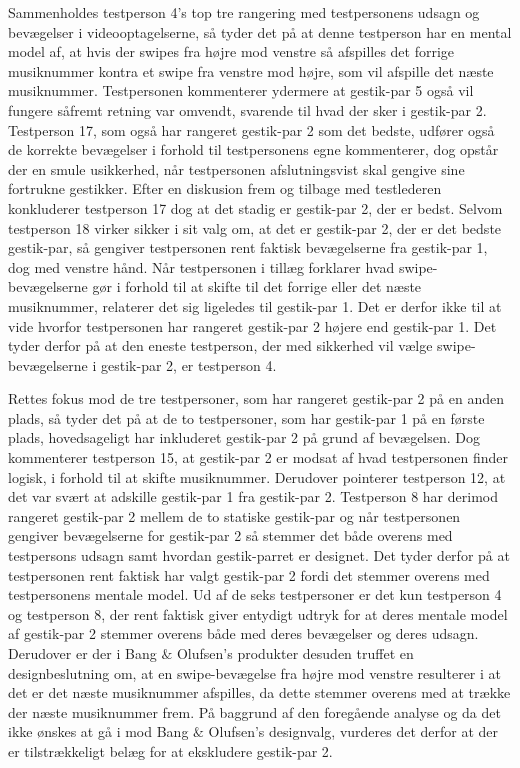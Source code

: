 Sammenholdes testperson 4's top tre rangering med testpersonens udsagn og bevægelser i videooptagelserne, så tyder det på at denne testperson har en mental model af, at hvis der swipes fra højre mod venstre så afspilles det forrige musiknummer kontra et swipe fra venstre mod højre, som vil afspille det næste musiknummer. Testpersonen kommenterer ydermere at gestik-par 5 også vil fungere såfremt retning var omvendt, svarende til hvad der sker i gestik-par 2. Testperson 17, som også har rangeret gestik-par 2 som det bedste, udfører også de korrekte bevægelser i forhold til testpersonens egne kommenterer, dog opstår der en smule usikkerhed, når testpersonen afslutningsvist skal gengive sine fortrukne gestikker. Efter en diskusion frem og tilbage med testlederen konkluderer testperson 17 dog at det stadig er gestik-par 2, der er bedst. Selvom testperson 18 virker sikker i sit valg om, at det er gestik-par 2, der er det bedste gestik-par, så gengiver testpersonen rent faktisk bevægelserne fra gestik-par 1, dog med venstre hånd. Når testpersonen i tillæg forklarer hvad swipe-bevægelserne gør i forhold til at skifte til det forrige eller det næste musiknummer, relaterer det sig ligeledes til gestik-par 1. Det er derfor ikke til at vide hvorfor testpersonen har rangeret gestik-par 2 højere end gestik-par 1. Det tyder derfor på at den eneste testperson, der med sikkerhed vil vælge swipe-bevægelserne i gestik-par 2, er testperson 4. 

Rettes fokus mod de tre testpersoner, som har rangeret gestik-par 2 på en anden plads, så tyder det på at de to testpersoner, som har gestik-par 1 på en første plads, hovedsageligt har inkluderet gestik-par 2 på grund af bevægelsen. Dog kommenterer testperson 15, at gestik-par 2 er modsat af hvad testpersonen finder logisk, i forhold til at skifte musiknummer.  Derudover pointerer testperson 12, at det var svært at adskille gestik-par 1 fra gestik-par 2. Testperson 8 har derimod rangeret gestik-par 2 mellem de to statiske gestik-par og når testpersonen gengiver bevægelserne for gestik-par 2 så stemmer det både overens med testpersons udsagn samt hvordan gestik-parret er designet. Det tyder derfor på at testpersonen rent faktisk har valgt gestik-par 2 fordi det stemmer overens med testpersonens mentale model.\blankline 
%
Ud af de seks testpersoner er det kun testperson 4 og testperson 8, der rent faktisk giver entydigt udtryk for at deres mentale model af gestik-par 2 stemmer overens både med deres bevægelser og deres udsagn. Derudover er der i Bang $\&$ Olufsen's produkter desuden truffet en designbeslutning om, at en swipe-bevægelse fra højre mod venstre resulterer i at det er det næste musiknummer afspilles, da dette stemmer overens med at trække der næste musiknummer frem. På baggrund af den foregående analyse og da det ikke ønskes at gå i mod Bang $\&$ Olufsen's designvalg, vurderes det derfor at der er tilstrækkeligt belæg for at ekskludere gestik-par 2. 

